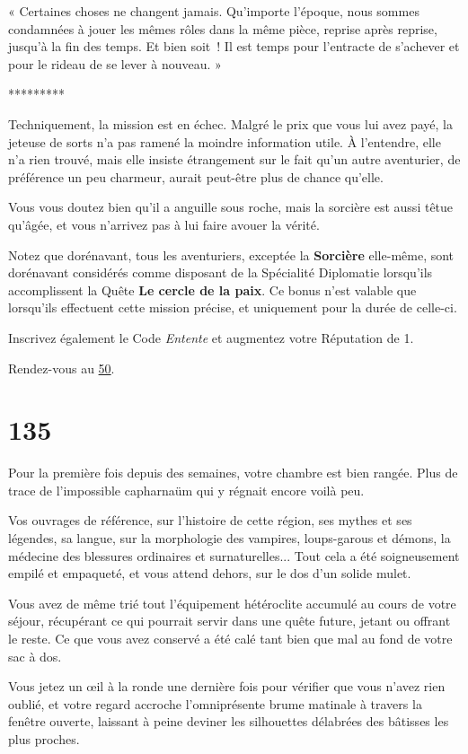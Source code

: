 \documentclass{report}
\newcommand{\gsection}[1]{
    \section{#1}
    \label{section-#1}
}
\newcommand{\glink}[1]{\hyperref[section-#1]{#1}}
\newcommand{\ellipse}{
    \begin{center}
        *********
    \end{center}
}
\newcommand{\hero}[1]{\textbf{#1}}
\begin{document}
« Certaines choses ne changent jamais. Qu'importe l'époque, nous sommes condamnées à jouer les mêmes rôles dans la même pièce, reprise après reprise, jusqu'à la fin des temps. Et bien soit ! Il est temps pour l'entracte de s'achever et pour le rideau de se lever à nouveau. »

\ellipse

Techniquement, la mission est en échec. Malgré le prix que vous lui avez payé, la jeteuse de sorts n'a pas ramené la moindre information utile. À l'entendre, elle n'a rien trouvé, mais elle insiste étrangement sur le fait qu'un autre aventurier, de préférence un peu charmeur, aurait peut-être plus de chance qu'elle.

Vous vous doutez bien qu'il a anguille sous roche, mais la sorcière est aussi têtue qu'âgée, et vous n'arrivez pas à lui faire avouer la vérité.

Notez que dorénavant, tous les aventuriers, exceptée la \hero{Sorcière} elle-même, sont dorénavant considérés comme disposant de la Spécialité Diplomatie lorsqu'ils accomplissent la Quête \textbf{Le cercle de la paix}. Ce bonus n'est valable que lorsqu'ils effectuent cette mission précise, et uniquement pour la durée de celle-ci.

Inscrivez également le Code \emph{Entente} et augmentez votre Réputation de 1.

Rendez-vous au \glink{50}.

\clearpage

\gsection{135}

Pour la première fois depuis des semaines, votre chambre est bien rangée. Plus de trace de l'impossible capharnaüm qui y régnait encore voilà peu. 

Vos ouvrages de référence, sur l'histoire de cette région, ses mythes et ses légendes, sa langue, sur la morphologie des vampires, loups-garous et démons, la médecine des blessures ordinaires et surnaturelles... Tout cela a été soigneusement empilé et empaqueté, et vous attend dehors, sur le dos d'un solide mulet. 

Vous avez de même trié tout l'équipement hétéroclite accumulé au cours de votre séjour, récupérant ce qui pourrait servir dans une quête future, jetant ou offrant le reste. Ce que vous avez conservé a été calé tant bien que mal au fond de votre sac à dos. 

Vous jetez un œil à la ronde une dernière fois pour vérifier que vous n'avez rien oublié, et votre regard accroche l'omniprésente brume matinale à travers la fenêtre ouverte, laissant à peine deviner les silhouettes délabrées des bâtisses les plus proches. 
\end{document}
